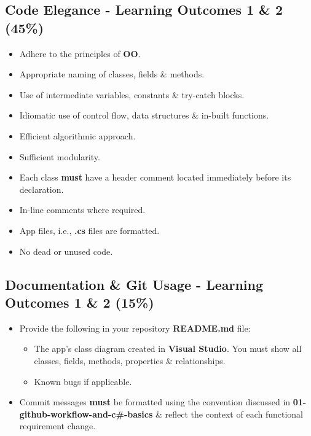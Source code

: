 \documentclass{article}
\begin{document}
\subsection*{Code Elegance - Learning Outcomes 1 \& 2  (45\%)}
\begin{itemize}
    \item Adhere to the principles of \textbf{OO}.
    \item Appropriate naming of classes, fields \& methods.
    \item Use of intermediate variables, constants \& try-catch blocks.
    \item Idiomatic use of control flow, data structures \& in-built functions.
    \item Efficient algorithmic approach.
    \item Sufficient modularity.
    \item Each class \textbf{must} have a header comment located immediately before its declaration.
    \item In-line comments where required. 
    \item App files, i.e., \textbf{.cs} files are formatted. 
    \item No dead or unused code.
\end{itemize}

\subsection*{Documentation \& Git Usage - Learning Outcomes 1 \& 2 (15\%)}
\begin{itemize}
    \item Provide the following in your repository \textbf{README.md} file:
    \begin{itemize}
        \item The app's class diagram created in \textbf{Visual Studio}. You must show all classes, fields, methods, properties \& relationships.
        \item Known bugs if applicable.
    \end{itemize}
    \item Commit messages \textbf{must} be formatted using the convention discussed in \textbf{01-github-workflow-and-c\#-basics} \& reflect the context of each functional requirement change.
\end{itemize}
\end{document}
